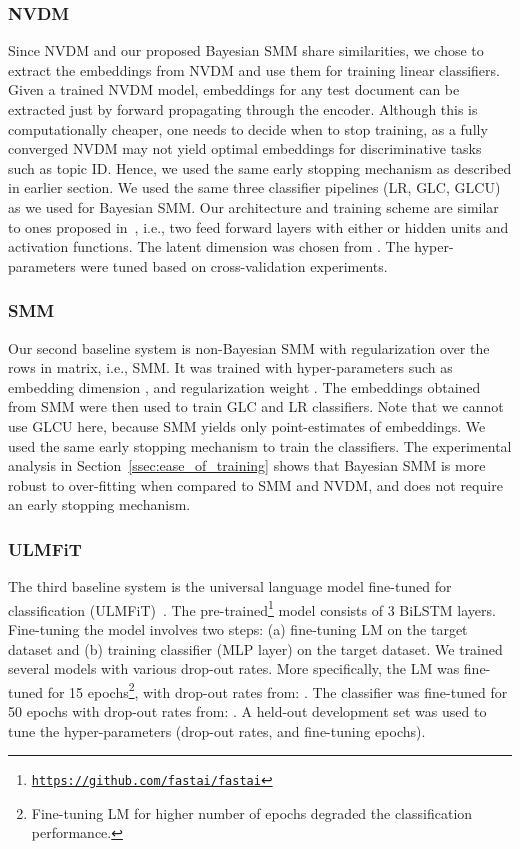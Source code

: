 \documentclass[journal]{IEEEtran}
\begin{document}
\subsubsection{NVDM}
\label{ssec:nvdm_base}
Since NVDM and our proposed Bayesian
SMM share similarities, we chose to extract the embeddings from NVDM and use
them for training linear classifiers. Given a trained NVDM model, embeddings 
for any test document can be extracted just by forward propagating through 
the encoder. Although this is computationally cheaper, one needs to decide 
when to stop training, as a fully converged NVDM may not yield optimal 
embeddings for discriminative tasks such as topic ID. Hence, we used the same
early stopping mechanism as described in earlier section. We used the same 
three classifier pipelines (LR, GLC, GLCU) as we used for Bayesian SMM. Our 
architecture and training scheme are similar to ones proposed 
in~\cite{NVI:2016}, i.e., two 
feed forward layers with either  or  hidden units and 
 activation functions. 
The latent dimension was chosen from . The 
hyper-parameters were tuned based on cross-validation experiments.

\subsubsection{SMM}
Our second baseline system is non-Bayesian SMM with  regularization
over the rows in  matrix, i.e.,  SMM. It was trained with
hyper-parameters such as embedding dimension , and regularization weight . The 
embeddings obtained from SMM were then used to train GLC and LR classifiers. 
Note that we cannot use GLCU here, because SMM yields only point-estimates of
embeddings. We used the same early stopping mechanism to train the classifiers. 
The experimental analysis in Section~\ref{ssec:ease_of_training} shows that 
Bayesian SMM is more robust to over-fitting when compared to SMM and NVDM, 
and does not require an early stopping mechanism.

\subsubsection{ULMFiT}
The third baseline system is the universal language model fine-tuned for 
classification (ULMFiT)~\cite{Ruder:2018:Universal}.
The pre-trained\footnote{\texttt{\url{https://github.com/fastai/fastai}}} 
model consists of 3 BiLSTM layers. Fine-tuning the model involves two steps: 
(a) fine-tuning LM on the target dataset and (b) training classifier (MLP 
layer) on the target dataset. We trained several models with various drop-out 
rates. More specifically, the LM was fine-tuned for 15 
epochs\footnote{Fine-tuning LM for higher number of epochs degraded the 
classification performance.}, with drop-out rates from: . The classifier was fine-tuned for 50 epochs with drop-out rates from: 
. A held-out development set was used to tune the 
hyper-parameters (drop-out rates, and fine-tuning epochs).
\end{document}
